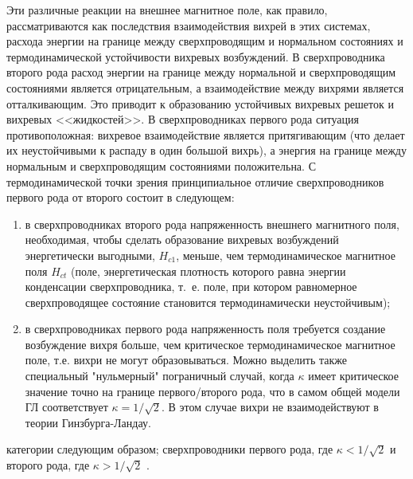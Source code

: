 Эти различные реакции на внешнее магнитное поле, как правило, рассматриваются
как последствия взаимодействия вихрей в этих системах, расхода энергии на
границе между сверхпроводящим и нормальном состояниях и термодинамической
устойчивости вихревых возбуждений. В сверхпроводника второго рода расход
энергии на границе между нормальной и сверхпроводящим состояниями является
отрицательным, а взаимодействие между вихрями является
отталкивающим\cite{bib:3}. Это приводит к образованию устойчивых вихревых
решеток и вихревых <<жидкостей>>. В сверхпроводниках первого рода ситуация
противоположная: вихревое взаимодействие является притягивающим (что делает их
неустойчивыми к распаду в один большой вихрь), а энергия на границе между
нормальным и сверхпроводящим состояниями положительна. С термодинамической 
точки зрения принципиальное отличие сверхпроводников первого рода от второго 
состоит в следующем:
\begin{enumerate}
  \item в сверхпроводниках второго рода напряженность внешнего
    магнитного поля, необходимая, чтобы сделать образование вихревых возбуждений
    энергетически выгодными, \( H_{c1} \), меньше, чем термодинамическое
    магнитное поля \( H_{ct} \) (поле, энергетическая плотность которого равна
    энергии конденсации сверхпроводника, т.~е. поле, при котором равномерное
    сверхпроводящее состояние становится термодинамически неустойчивым);
  \item в сверхпроводниках первого рода напряженность поля требуется создание 
возбуждение вихря больше, чем критическое термодинамическое магнитное поле, 
т.е. вихри не могут образовываться. Можно выделить также специальный 
"нульмерный" пограничный случай, когда \( \kappa \) имеет критическое значение 
точно на границе первого/второго рода, что в самом общей модели ГЛ 
соответствует \( \kappa = 1/\sqrt{2} \). В этом случае вихри не 
взаимодействуют\cite{bib:5} в теории Гинзбурга-Ландау.
\end{enumerate}
категории следующим образом; сверхпроводники первого рода, где 
\( \kappa < 1/\sqrt{2} \) и второго рода, где \( \kappa > 1/\sqrt{2} \) 
\cite{bib:3}.

